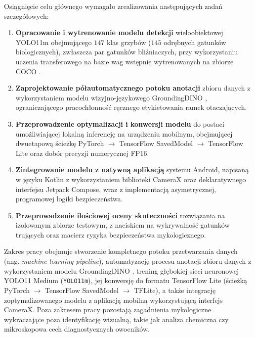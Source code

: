 Osiągnięcie celu głównego wymagało zrealizowania następujących zadań szczegółowych:
\begin{enumerate}[label=\textbf{Z\arabic*.}]
 \item \textbf{Opracowanie i wytrenowanie modelu detekcji} wieloobiektowej YOLO11m obejmującego $147$ klas grzybów ($145$ odrębnych gatunków biologicznych), zwłaszcza par gatunków bliźniaczych, przy wykorzystaniu uczenia transferowego na bazie wag wstępnie wytrenowanych na zbiorze COCO \cite{lin2014coco}.
 \item \textbf{Zaprojektowanie półautomatycznego potoku anotacji} zbioru danych z wykorzystaniem modelu wizyjno-językowego GroundingDINO \cite{liu2023grounding}, ograniczającego pracochłonność ręcznego etykietowania ramek otaczających.
 \item \textbf{Przeprowadzenie optymalizacji i konwersji modelu} do postaci umożliwiającej lokalną inferencję na urządzeniu mobilnym, obejmującej dwuetapową ścieżkę PyTorch $\to$ TensorFlow SavedModel $\to$ TensorFlow Lite oraz dobór precyzji numerycznej FP16.
 \item \textbf{Zintegrowanie modelu z natywną aplikacją} systemu Android, napisaną w języku Kotlin z wykorzystaniem biblioteki CameraX oraz deklaratywnego interfejsu Jetpack Compose, wraz z implementacją asymetrycznej, programowej logiki bezpieczeństwa.
 \item \textbf{Przeprowadzenie ilościowej oceny skuteczności} rozwiązania na izolowanym zbiorze testowym, z naciskiem na wykrywalność gatunków trujących oraz macierz ryzyka bezpieczeństwa mykologicznego.
\end{enumerate}

Zakres pracy obejmuje stworzenie kompletnego potoku przetwarzania danych (ang. \textit{machine learning pipeline}), automatyzację procesu anotacji zbioru danych z wykorzystaniem modelu GroundingDINO \cite{liu2023grounding}, trening głębokiej sieci neuronowej YOLO11 Medium (\texttt{YOLO11m}), jej konwersję do formatu TensorFlow Lite (ścieżką PyTorch $\to$ TensorFlow SavedModel $\to$ TFLite), a także integrację zoptymalizowanego modelu z aplikacją mobilną wykorzystującą interfejs CameraX. Poza zakresem pracy pozostają zagadnienia mykologiczne wykraczające poza identyfikację wizualną, takie jak analiza chemiczna czy mikroskopowa cech diagnostycznych owocników.

